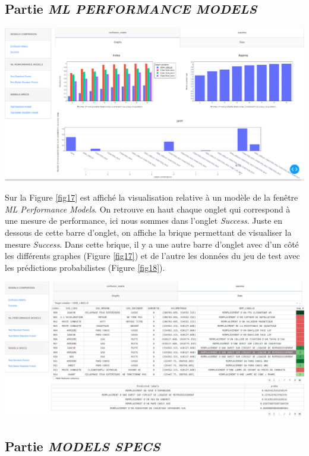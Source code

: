 \subsection{Partie \textit{ML PERFORMANCE MODELS}}

\begin{center}
\includegraphics[scale=0.25]{figures/app_models.png}
\label{fig17}
\end{center}

Sur la Figure \ref{fig17} est affiché la visualisation relative à un modèle de la fenêtre \textit{ML Performance Models}. On retrouve en haut chaque onglet qui correspond à une mesure de performance, ici nous sommes dans l’onglet \textit{Success}. Juste en dessous de cette barre d’onglet, on affiche la brique permettant de visualiser la mesure \textit{Success}. Dans cette brique, il y a une autre barre d’onglet avec d’un côté les différents graphes (Figure \ref{fig17}) et de l’autre les données du jeu de test avec les prédictions probabilistes (Figure \ref{fig18}).

\begin{center}
\includegraphics[scale=0.25]{figures/app_models_table.png}
\label{fig18}
\end{center}

\subsection{Partie \textit{MODELS SPECS}}

